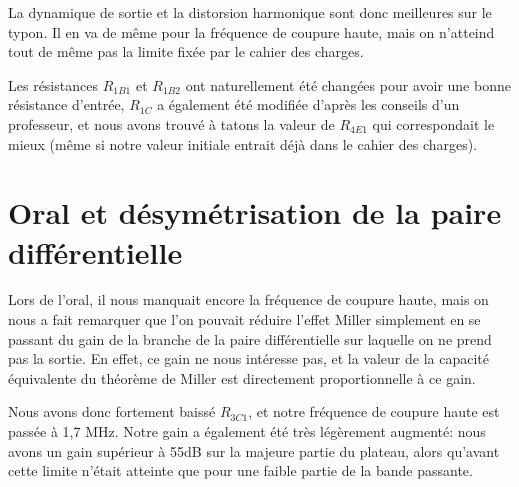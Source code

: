 La dynamique de sortie et la distorsion harmonique sont donc meilleures sur le typon. Il en va de même pour la fréquence de coupure haute, mais on n’atteind tout de même pas la limite fixée par le cahier des charges.

Les résistances $R_{1B1}$ et $R_{1B2}$ ont naturellement été changées pour avoir une bonne résistance d’entrée, $R_{1C}$ a également été modifiée d’après les conseils d’un professeur, et nous avons trouvé à tatons la valeur de $R_{4E1}$ qui correspondait le mieux (même si notre valeur initiale entrait déjà dans le cahier des charges).


\section{Oral et désymétrisation de la paire différentielle}

Lors de l’oral, il nous manquait encore la fréquence de coupure haute, mais on nous a fait remarquer que l’on pouvait réduire l’effet Miller simplement en se passant du gain de la branche de la paire différentielle sur laquelle on ne prend pas la sortie. En effet, ce gain ne nous intéresse pas, et la valeur de la capacité équivalente du théorème de Miller est directement proportionnelle à ce gain.

Nous avons donc fortement baissé $R_{3C1}$, et notre fréquence de coupure haute est passée à 1,7 MHz. Notre gain a également été très légèrement augmenté: nous avons un gain supérieur à 55dB sur la majeure partie du plateau, alors qu’avant cette limite n’était atteinte que pour une faible partie de la bande passante.

